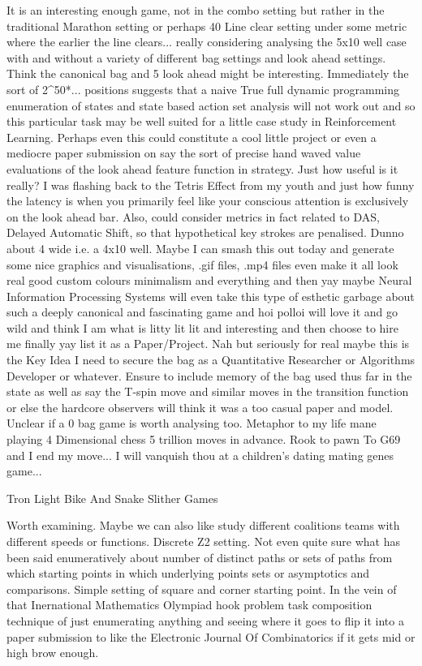 It is an interesting enough game, not in the combo setting but rather in the traditional Marathon setting or perhaps 40 Line clear setting under some metric where the earlier the line clears... really considering analysing the 5x10 well case with and without a variety of different bag settings and look ahead settings. Think the canonical bag and 5 look ahead might be interesting. Immediately the sort of 2^50*... positions suggests that a naive True full dynamic programming enumeration of states and state based action set analysis will not work out and so this particular task may be well suited for a little case study in Reinforcement Learning. Perhaps even this could constitute a cool little project or even a mediocre paper submission on say the sort of precise hand waved value evaluations of the look ahead feature function in strategy. Just how useful is it really? I was flashing back to the Tetris Effect from my youth and just how funny the latency is when you primarily feel like your conscious attention is exclusively on the look ahead bar. Also, could consider metrics in fact related to DAS, Delayed Automatic Shift, so that hypothetical key strokes are penalised. Dunno about 4 wide i.e. a 4x10 well. Maybe I can smash this out today and generate some nice graphics and visualisations, .gif files, .mp4 files even make it all look real good custom colours minimalism and everything and then yay maybe Neural Information Processing Systems will even take this type of esthetic garbage about such a deeply canonical and fascinating game and hoi polloi will love it and go wild and think I am what is litty lit lit and interesting and then choose to hire me finally yay list it as a Paper/Project. Nah but seriously for real maybe this is the Key Idea I need to secure the bag as a Quantitative Researcher or Algorithms Developer or whatever. Ensure to include memory of the bag used thus far in the state as well as say the T-spin move and similar moves in the transition function or else the hardcore observers will think it was a too casual paper and model. Unclear if a 0 bag game is worth analysing too. Metaphor to my life mane playing 4 Dimensional chess 5 trillion moves in advance. Rook to pawn To G69 and I end my move... I will vanquish thou at a children's dating mating genes game...

	Tron Light Bike And Snake Slither Games

Worth examining. Maybe we can also like study different coalitions teams with different speeds or functions. Discrete Z2 setting. Not even quite sure what has been said enumeratively about number of distinct paths or sets of paths from which starting points in which underlying points sets or asymptotics and comparisons. Simple setting of square and corner starting point. In the vein of that Inernational Mathematics Olympiad hook problem task composition technique of just enumerating anything and seeing where it goes to flip it into a paper submission to like the Electronic Journal Of Combinatorics if it gets mid or high brow enough.

